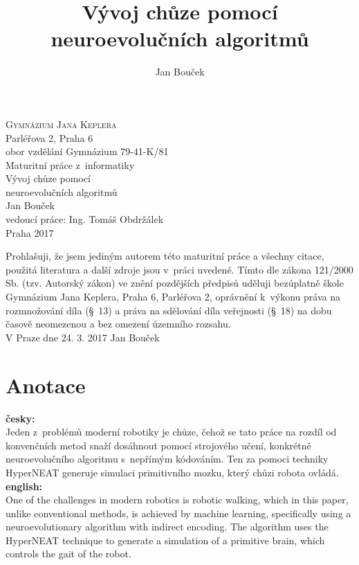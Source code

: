 \documentclass[a4]{article}
\begin{document}
 
 
\begin{titlepage} 
\begin{center} 
{\huge\textsc{Gymnázium Jana Keplera}\\}
{\large{Parléřova 2, Praha 6}}\\
{\large{obor vzdělání Gymnázium 79-41-K/81}\\[5cm]} 
{\Large{Maturitní práce z~informatiky}\\[0.2cm]}
{\Huge{Vývoj chůze pomocí\\neuroevolučních algoritmů}}\\\vfill
{\Large{Jan Bouček}\\} 
{\large{vedoucí práce: Ing. Tomáš Obdržálek}\\} 
{\large{Praha 2017}} 
\end{center} 
\end{titlepage} 
 
\newpage 
Prohlašuji, že jsem jediným autorem této maturitní práce a všechny citace, použitá literatura a další zdroje jsou v~práci uvedené. Tímto dle zákona 121/2000 Sb. (tzv. Autorský zákon) ve znění pozdějších předpisů uděluji bezúplatně škole Gymnázium Jana Keplera, Praha 6, Parléřova 2, oprávnění k~výkonu práva na rozmnožování díla (§~13) a práva na sdělování díla veřejnosti (§~18) na dobu časově neomezenou a bez omezení územního rozsahu.\\[0.7cm] 
\vspace{10cm} 
{\large{V Praze dne 24. 3. 2017} \hfill Jan Bouček} 
\newpage 
\tableofcontents
\newpage

\title{Vývoj chůze pomocí neuroevolučních algoritmů} 
\author{Jan Bouček} 
\date{} 
\maketitle 

\section{Anotace}
\large{
\textbf{česky:\\}
}
Jeden z~problémů moderní robotiky je chůze, čehož se tato práce na rozdíl od konvenčních metod snaží dosáhnout pomocí strojového učení, konkrétně neuroevolučního algoritmu s~nepřímým kódováním. Ten za pomoci techniky HyperNEAT generuje simulaci primitivního mozku, který chůzi robota ovládá.\\
\large{\textbf{english:\\}}
One of the challenges in modern robotics is robotic walking, which in this paper, unlike conventional methods, is achieved by machine learning, specifically using a neuroevolutionary algorithm with indirect encoding. The algorithm uses the HyperNEAT technique to generate a simulation of a primitive brain, which controls the gait of the robot.\par 
\end{document}
